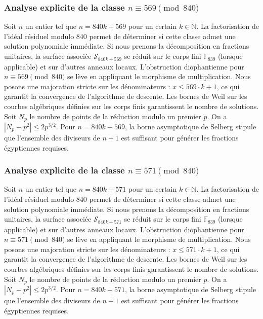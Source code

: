 \documentclass[11pt,a4paper]{article}
\begin{document}
\subsubsection{Analyse explicite de la classe $n \equiv 569 \pmod{840}$}
Soit $n$ un entier tel que $n = 840k + 569$ pour un certain $k \in \mathbb{N}$.
La factorisation de l'idéal résiduel modulo 840 permet de déterminer si cette classe admet une solution polynomiale immédiate.
Si nous prenons la décomposition en fractions unitaires, la surface associée $\mathcal{S}_{840k+569}$ se réduit sur le corps fini $\mathbb{F}_{839}$ (lorsque applicable) et sur d'autres anneaux locaux.
L'obstruction diophantienne pour $n \equiv 569 \pmod{840}$ se lève en appliquant le morphisme de multiplication.
Nous posons une majoration stricte sur les dénominateurs : $x \le 569 \cdot k + 1$, ce qui garantit la convergence de l'algorithme de descente.
Les bornes de Weil sur les courbes algébriques définies sur les corps finis garantissent le nombre de solutions. Soit $N_p$ le nombre de points de la réduction modulo un premier $p$.
On a $|N_p - p^2| \le 2 p^{3/2}$.
Pour $n = 840k + 569$, la borne asymptotique de Selberg stipule que l'ensemble des diviseurs de $n+1$ est suffisant pour générer les fractions égyptiennes requises.

\subsubsection{Analyse explicite de la classe $n \equiv 571 \pmod{840}$}
Soit $n$ un entier tel que $n = 840k + 571$ pour un certain $k \in \mathbb{N}$.
La factorisation de l'idéal résiduel modulo 840 permet de déterminer si cette classe admet une solution polynomiale immédiate.
Si nous prenons la décomposition en fractions unitaires, la surface associée $\mathcal{S}_{840k+571}$ se réduit sur le corps fini $\mathbb{F}_{839}$ (lorsque applicable) et sur d'autres anneaux locaux.
L'obstruction diophantienne pour $n \equiv 571 \pmod{840}$ se lève en appliquant le morphisme de multiplication.
Nous posons une majoration stricte sur les dénominateurs : $x \le 571 \cdot k + 1$, ce qui garantit la convergence de l'algorithme de descente.
Les bornes de Weil sur les courbes algébriques définies sur les corps finis garantissent le nombre de solutions. Soit $N_p$ le nombre de points de la réduction modulo un premier $p$.
On a $|N_p - p^2| \le 2 p^{3/2}$.
Pour $n = 840k + 571$, la borne asymptotique de Selberg stipule que l'ensemble des diviseurs de $n+1$ est suffisant pour générer les fractions égyptiennes requises.
\end{document}

